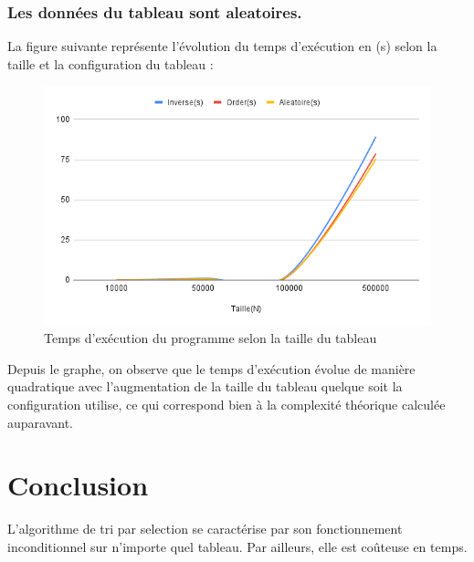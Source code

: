 \subsubsection{Les données du tableau sont aleatoires.}
\small
\begin{center}
\end{center}
\normalsize
\par
La figure suivante représente l’évolution du temps d’exécution en (s) selon la taille et la configuration du tableau :
\begin{figure}[H]
    \centering
        \includegraphics[scale=0.7]{ressources/selectexp.png}
        \caption{Temps d'exécution du programme selon la taille du tableau}
    \label{fig:temps_exec_dico_theo}
\end{figure} 
\par
Depuis le graphe, on observe que le temps d’exécution évolue de manière quadratique avec l’augmentation de la taille du tableau quelque soit la configuration utilise, ce qui correspond bien à la complexité théorique calculée auparavant.
\section{Conclusion}
L’algorithme de tri par selection se caractérise par son fonctionnement inconditionnel sur n’importe quel tableau. Par ailleurs, elle est coûteuse en temps. 